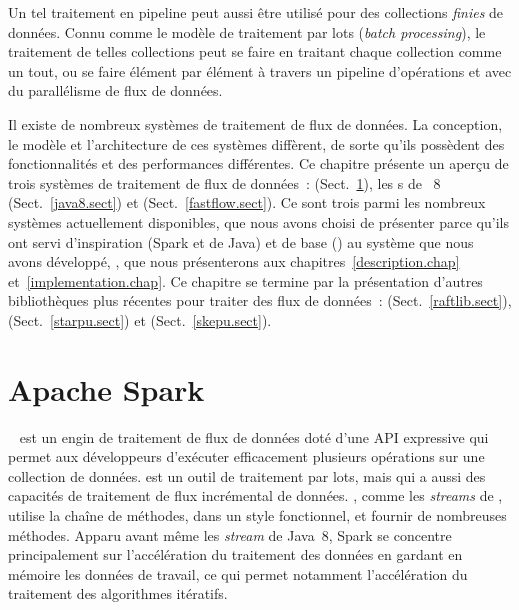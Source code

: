 Un tel traitement en pipeline peut aussi \^etre utilis\'e pour des collections \emph{finies} de donn\'ees. Connu comme le mod\`ele de traitement par lots (\emph{batch processing}), le traitement de telles collections peut se faire en traitant chaque collection comme un tout, ou se faire \'el\'ement par \'el\'ement \`a travers un pipeline d'op\'erations et avec du parall\'elisme de flux de donn\'ees.


Il existe de nombreux syst\`emes de traitement de flux de donn\'ees. La conception, le mod\`ele et l'architecture de ces syst\`emes diff\`erent, de sorte qu'ils poss\`edent des fonctionnalit\'es et des performances diff\'erentes. Ce chapitre pr\'esente un aper\c{c}u de trois syst\`emes de traitement de flux de donn\'ees~:  (Sect.~\ref{spark.sect}), les s de ~8 (Sect.~\ref{java8.sect}) et  (Sect.~\ref{fastflow.sect}).  Ce sont trois parmi les nombreux syst\`emes actuellement disponibles, que nous avons choisi de pr\'esenter parce qu'ils ont servi d'inspiration (Spark et  de Java) et de base () au syst\`eme que nous avons d\'evelopp\'e, \ppff, que nous pr\'esenterons aux chapitres~\ref{description.chap} et~\ref{implementation.chap}. Ce chapitre se termine par la pr\'esentation d'autres biblioth\`eques  plus r\'ecentes pour traiter des flux de donn\'ees~:  (Sect.~\ref{raftlib.sect}),  (Sect.~\ref{starpu.sect}) et  (Sect.~\ref{skepu.sect}).
%



\section{Apache Spark}

\label{spark.sect}


~\citep{apachSpark} est un engin de traitement de flux de donn\'ees dot\'e d'une API expressive qui permet aux d\'eveloppeurs d'ex\'ecuter efficacement plusieurs op\'erations sur une collection de donn\'ees.  est un outil de traitement par lots, mais qui a aussi des capacit\'es de traitement de flux incr\'emental de donn\'ees. , comme les \emph{streams} de , utilise la cha\^ine de m\'ethodes, dans un style fonctionnel, et fournir de nombreuses m\'ethodes. Apparu avant m\^eme les \emph{stream} de Java~8, Spark se concentre principalement sur l'acc\'el\'eration du traitement des donn\'ees en gardant en m\'emoire les donn\'ees de travail, ce qui permet notamment l'acc\'el\'eration du traitement des algorithmes it\'eratifs.

